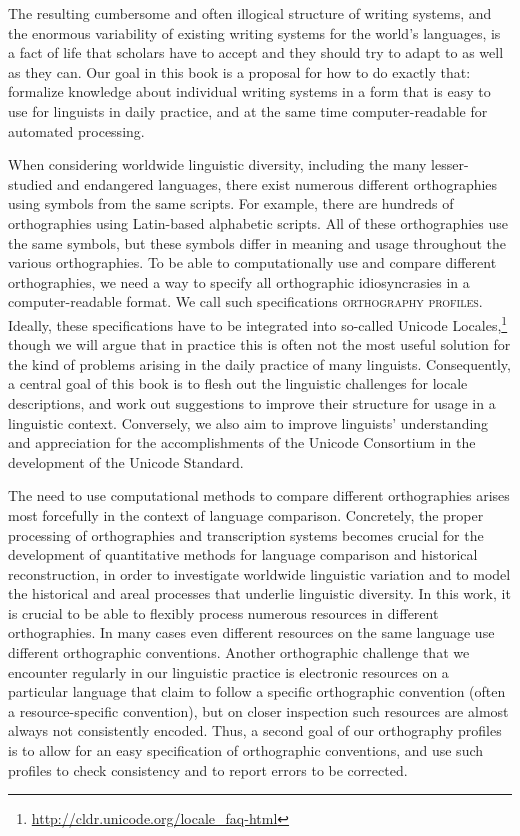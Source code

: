 The resulting cumbersome and often illogical structure of writing systems, and
the enormous variability of existing writing systems for the world's languages, 
is a fact of life that scholars have to accept and they should try to adapt to as well as
they can. Our goal in this book is a proposal for how to do exactly that: formalize 
knowledge about individual writing systems in a form that is easy to use 
for linguists in daily practice, and at the same time computer-readable for 
automated processing.

When considering worldwide linguistic diversity, including the many
lesser-studied and endangered languages, there exist numerous different
orthographies using symbols from the same scripts. For example, there are
hundreds of orthographies using Latin-based alphabetic scripts. All of these
orthographies use the same symbols, but these symbols differ in meaning and
usage throughout the various orthographies. To be able to computationally use
and compare different orthographies, we need a way to specify all orthographic
idiosyncrasies in a computer-readable format. We call such specifications
\textsc{orthography profiles}. Ideally, these specifications have to be
integrated into so-called Unicode Locales,\footnote{\url{http://cldr.unicode.org/locale_faq-html}} 
though we will argue that in practice this is often not the most useful solution for the kind of problems
arising in the daily practice of many linguists. Consequently, a central goal of
this book is to flesh out the linguistic challenges for locale descriptions,
and work out suggestions to improve their structure for usage in a linguistic
context. Conversely, we also aim to improve linguists' understanding and
appreciation for the accomplishments of the Unicode Consortium in the
development of the Unicode Standard.

The need to use computational methods to compare different orthographies arises most
forcefully in the context of language comparison. Concretely, the proper
processing of orthographies and transcription systems becomes crucial for the
development of quantitative methods for language comparison and historical
reconstruction, in order to investigate worldwide linguistic variation and to
model the historical and areal processes that underlie linguistic
diversity. In this work, it is crucial to be able to flexibly process numerous
resources in different orthographies. In many cases even different resources
on the same language use different orthographic conventions. Another
orthographic challenge that we encounter regularly in our linguistic practice is
electronic resources on a particular language that claim to follow a specific
orthographic convention (often a resource-specific convention), but on closer
inspection such resources are almost always not consistently encoded. Thus, a
second goal of our orthography profiles is to allow for an easy specification of
orthographic conventions, and use such profiles to check consistency and to
report errors to be corrected.

